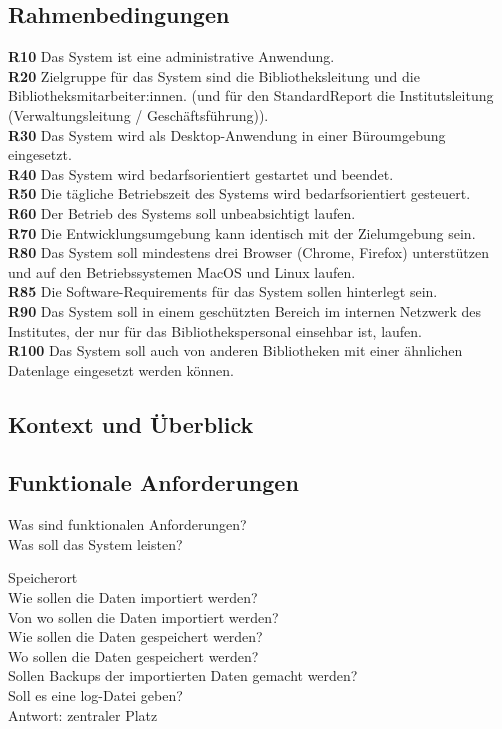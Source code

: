\subsection{Rahmenbedingungen}
\textbf{R10} Das System ist eine administrative Anwendung.\\ 
\textbf{R20} Zielgruppe für das System sind die Bibliotheksleitung und die Bibliotheksmitarbeiter:innen. (und für den StandardReport die Institutsleitung
(Verwaltungsleitung / Geschäftsführung)).\\
\textbf{R30} Das System wird als Desktop-Anwendung in einer Büroumgebung eingesetzt.\\
\textbf{R40} Das System wird bedarfsorientiert gestartet und beendet.\\
\textbf{R50} Die tägliche Betriebszeit des Systems wird bedarfsorientiert gesteuert.\\
\textbf{R60} Der Betrieb des Systems soll unbeabsichtigt laufen.\\
\textbf{R70} Die Entwicklungsumgebung kann identisch mit der Zielumgebung sein.\\
\textbf{R80} Das System soll mindestens drei Browser (Chrome, Firefox) unterstützen und auf den Betriebssystemen MacOS und Linux laufen.\\
\textbf{R85} Die Software-Requirements für das System sollen hinterlegt sein.\\
\textbf{R90} Das System soll in einem geschützten Bereich im internen Netzwerk des Institutes, der nur für das Bibliothekspersonal einsehbar ist, laufen.\\
\textbf{R100} Das System soll auch von anderen Bibliotheken mit einer ähnlichen Datenlage eingesetzt werden können.



\subsection{Kontext und Überblick}


\subsection{Funktionale Anforderungen}
Was sind funktionalen Anforderungen?\\
Was soll das System leisten?


Speicherort\\
Wie sollen die Daten importiert werden?\\
Von wo sollen die Daten importiert werden?\\
Wie sollen die Daten gespeichert werden?\\
Wo sollen die Daten gespeichert werden?\\
Sollen Backups der importierten Daten gemacht werden?\\
Soll es eine log-Datei geben?\\
Antwort: zentraler Platz\\

